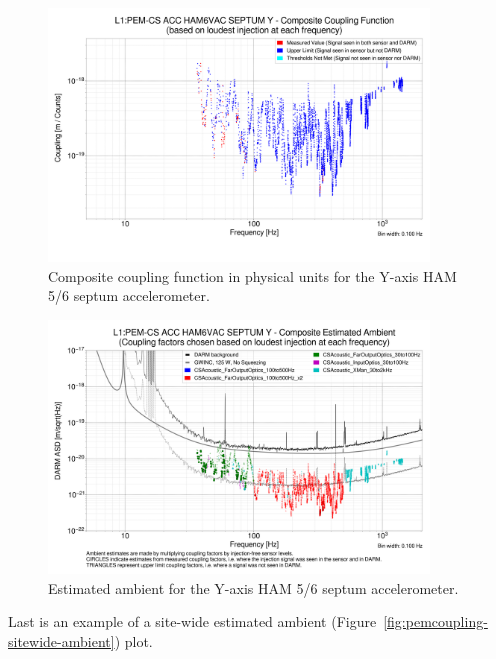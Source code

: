 \begin{figure}
  \centering
  \includegraphics[width=0.9\textwidth]{figures/appendix/pemcoupling-ccf-raw.png}
  \caption{Composite coupling function in physical units for the Y-axis HAM 5/6 septum accelerometer.}
  \label{fig:pemcoupling-ccf-raw}
\end{figure}

\begin{figure}
  \centering
  \includegraphics[width=0.9\textwidth]{figures/appendix/pemcoupling-ccf-ambient.png}
  \caption{Estimated ambient for the Y-axis HAM 5/6 septum accelerometer.}
  \label{fig:pemcoupling-ccf-ambient}
\end{figure}

Last is an example of a site-wide estimated ambient (Figure~\ref{fig:pemcoupling-sitewide-ambient}) plot.

